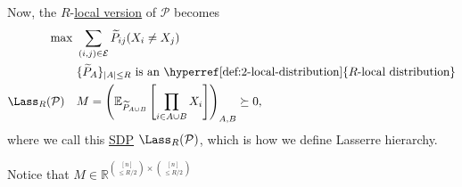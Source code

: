 Now, the \(R\)-\hyperref[def:local-distribution]{local version} of \(\mathcal{P} \) becomes
\[
	\begin{aligned}
		\max~                      & \sum_{(i, j)\in \mathcal{E} } \widetilde{P} _{ij} (X_i \neq X_j)                                                                   \\
		                           & \{\widetilde{P} _A\}_{\left\vert A \right\vert \leq R} \text{ is an \hyperref[def:2-local-distribution]{\(R\)-local distribution}} \\
		\Lass_R(\mathcal{P} )\quad & M = \left( \mathbb{E}_{\widetilde{P} _{A \cup B}} \left[ \prod_{i\in A \cup B} X_i \right] \right) _{A, B}\succeq 0,
	\end{aligned}
\]
where we call this \hyperref[def:SDP]{SDP} \(\Lass_R(\mathcal{P} )\), which is how we define Lasserre hierarchy.

\begin{note}
	Notice that \(M\in \mathbb{R} ^{\binom{[n]}{\leq R / 2} \times \binom{[n]}{\leq R / 2}}\)
\end{note}